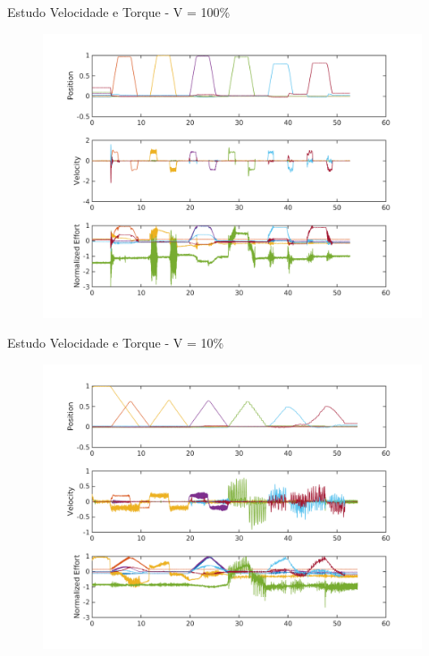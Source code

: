 \documentclass{beamer}
\begin{document}
\begin{frame}{Estudo Velocidade e Torque - V = 100\%}
   \begin{figure}
    \centering
    \includegraphics[width = 0.9\linewidth]{tex/figs/jointIdentificationFullSpeed_stiff90p.png}
    \label{fig:mekademo}
\end{figure}
\end{frame}

\begin{frame}{Estudo Velocidade e Torque - V = 10\%}
   \begin{figure}
    \centering
    \includegraphics[width = 0.9\linewidth]{tex/figs/jointIdentificationSpeed10p_stiff90p2.png}
    \label{fig:mekademo}
\end{figure}
\end{frame}
\end{document}
